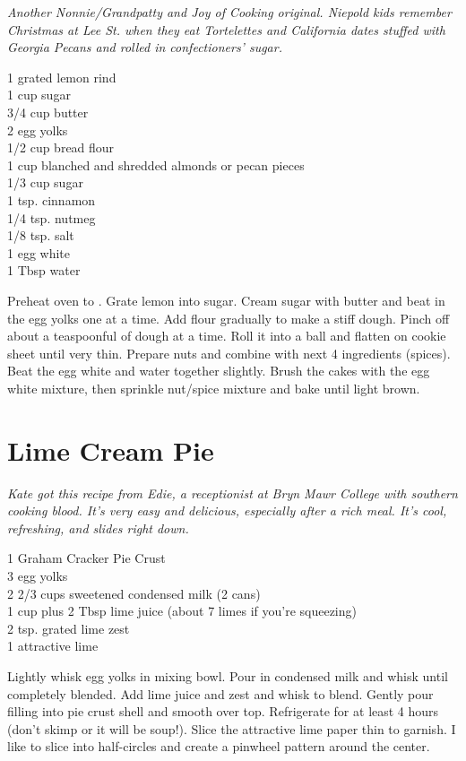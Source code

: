 \textit{Another Nonnie/Grandpatty and Joy of Cooking original. Niepold kids
remember Christmas at Lee St. when they eat Tortelettes and California dates
stuffed with Georgia Pecans and rolled in confectioners' sugar.}
\begin{ingredients}
1 grated lemon rind\\
1 cup sugar\\
3/4 cup butter\\
2 egg yolks \\
1/2 cup bread flour \\
1 cup blanched and shredded almonds or pecan pieces \\
1/3 cup sugar \\
1 tsp. cinnamon\\
1/4 tsp. nutmeg\\
1/8 tsp. salt\\
1 egg white\\
1 Tbsp water
\end{ingredients}
Preheat oven to . Grate lemon into sugar. Cream sugar with butter and
beat in the egg yolks one at a time. Add flour gradually to make a stiff
dough. Pinch off about a teaspoonful of dough at a time. Roll it into a ball
and flatten on cookie sheet until very thin. Prepare nuts and combine with
next 4 ingredients (spices). Beat the egg white and water together slightly.
Brush the cakes with the egg white mixture, then sprinkle nut/spice mixture
and bake until light brown.  

\section{Lime Cream Pie}

\textit{Kate got this recipe from Edie, a receptionist at Bryn Mawr College
with southern cooking blood. 
It's very easy and delicious, especially after a rich
meal. It's cool, refreshing, and slides right down.}
\begin{ingredients}
1 Graham Cracker Pie Crust\\
3 egg yolks\\
2 2/3 cups sweetened condensed milk (2 cans)\\
1 cup plus 2 Tbsp lime juice (about 7 limes if you're squeezing)\\
2 tsp. grated lime zest\\
1 attractive lime
\end{ingredients}
Lightly whisk egg yolks in mixing bowl. Pour in
condensed milk and whisk until completely blended.  Add lime juice and zest and
whisk to blend. Gently pour filling into pie crust shell and smooth over top.
Refrigerate for at least 4 hours (don't skimp or it will be soup!). Slice
the attractive lime paper thin to garnish. I like to slice into
half-circles and create a pinwheel pattern around the center. 
